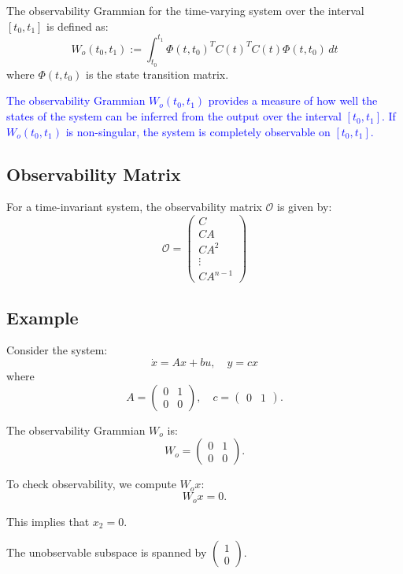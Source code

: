\documentclass{article}
\begin{document}
The observability Grammian for the time-varying system over the interval \( [t_0, t_1] \) is defined as:
\[
W_o(t_0, t_1) := \int_{t_0}^{t_1} \Phi(t, t_0)^T C(t)^T C(t) \Phi(t, t_0) \, dt
\]
where \( \Phi(t, t_0) \) is the state transition matrix.

\textcolor{blue}{The observability Grammian \( W_o(t_0, t_1) \) provides a measure of how well the states of the system can be inferred from the output over the interval \( [t_0, t_1] \). If \( W_o(t_0, t_1) \) is non-singular, the system is completely observable on \( [t_0, t_1] \).}

\subsection{Observability Matrix}

For a time-invariant system, the observability matrix \( \mathcal{O} \) is given by:
\[
\mathcal{O} = \begin{pmatrix}
C \\
CA \\
CA^2 \\
\vdots \\
CA^{n-1}
\end{pmatrix}
\]

\subsection{Example}

Consider the system:
\[
\dot{x} = Ax + bu, \quad y = cx
\]
where
\[
A = \begin{pmatrix}
0 & 1 \\
0 & 0
\end{pmatrix}, \quad c = \begin{pmatrix}
0 & 1
\end{pmatrix}.
\]

The observability Grammian \( W_o \) is:
\[
W_o = \begin{pmatrix}
0 & 1 \\
0 & 0
\end{pmatrix}.
\]

To check observability, we compute \( W_o x \):
\[
W_o x = 0.
\]

This implies that \( x_2 = 0 \).

The unobservable subspace is spanned by \( \begin{pmatrix} 1 \\ 0 \end{pmatrix} \).
\end{document}
